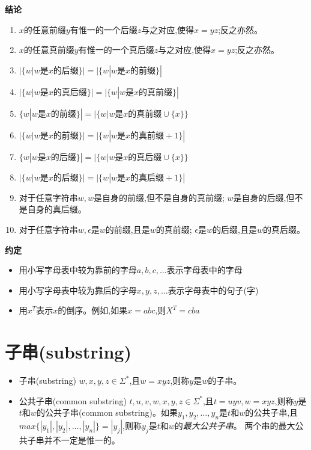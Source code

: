 \noindent \textbf{结论}

\begin{enumerate}
	\item $x$的任意前缀$y$有惟一的一个后缀$z$与之对应,使得$x=yz$;反之亦然。
	\item $x$的任意真前缀$y$有惟一的一个真后缀$z$与之对应,使得$x=yz$;反之亦然。
	\item $|\{w|w\text{是}x\text{的后缀}\}| = |\{w|w\text{是}x\text{的前缀}\}|$
	\item $|\{w|w\text{是}x\text{的真后缀}\}| = |\{w|w\text{是}x\text{的真前缀}\}|$
	\item $\{w|w\text{是}x\text{的前缀}\}| = |\{w|w\text{是}x\text{的真前缀}\cup \{x\}\}$
	\item $|\{w|w\text{是}x\text{的前缀}\}| = |\{w|w\text{是}x\text{的真前缀} + 1\}|$
	\item $\{w|w\text{是}x\text{的后缀}\}| = |\{w|w\text{是}x\text{的真后缀}\cup \{x\}\}$
	\item $|\{w|w\text{是}x\text{的后缀}\}| = |\{w|w\text{是}x\text{的真后缀} + 1\}|$
	\item 对于任意字符串$w,w$是自身的前缀,但不是自身的真前缀; $w$是自身的后缀,但不是自身的真后缀。
	\item 对于任意字符串$w,\epsilon$是$w$的前缀,且是$w$的真前缀; $\epsilon$是$w$的后缀,且是$w$的真后缀。
\end{enumerate}

\noindent \textbf{约定}
\begin{itemize}
	\item 用小写字母表中较为靠前的字母$a,b,c,\dots$表示字母表中的字母
	\item 用小写字母表中较为靠后的字母$x,y,z,\dots$表示字母表中的句子(字)
	\item 用$x^T$表示$x$的倒序。例如,如果$x=abc$,则$X^T=cba$
\end{itemize}

\section{子串(substring)}
\begin{itemize}
	\item 子串(substring)
		\subitem{-} $w,x,y,z\in \Sigma^{\ast}$,且$w=xyz$,则称$y$是$w$的子串。
	\item 公共子串(common substring)
		\subitem{-} $t,u,v,w,x,y,z\in \Sigma^{\ast}$,且$t=uyv,w=xyz$,则称$y$是$t$和$w$的公共子串(common substring)。如果$y_1,y_2,\dots,y_n$是$t$和$w$的公共子串,且$max\{|y_1|,|y_2|,\dots,|y_n|\}=|y_j|$,则称$y_j$是$t$和$w$的\emph{最大公共子串}。
		\subitem{-} 两个串的最大公共子串并不一定是惟一的。
\end{itemize}

